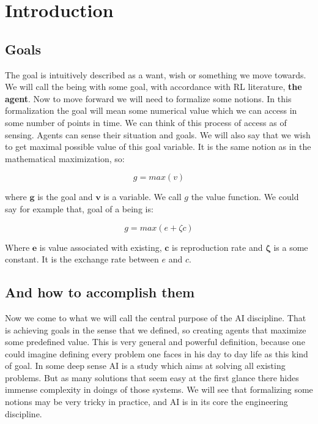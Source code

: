 \setcounter{page}{1}
%

\chapter{Introduction}
\label{chap:intro}



\section{Goals}

The goal is intuitively described as a want, wish or something we move towards. We will call the being with some goal, with accordance with RL literature, \textbf{the agent}. Now to move forward we will need to formalize some notions. In this formalization the goal will mean some numerical value which we can access in some number of points in time. We can think of this process of access as of sensing. Agents can sense their situation and goals. We will also say that we wish to get maximal possible value of this goal variable. It is the same notion as in the mathematical maximization, so:

\begin{equation}
	g = max(v)
\end{equation}

where $\boldsymbol{g}$ is the goal and $\boldsymbol{v}$ is a variable. We call $g$ the value function. We could say for example that, goal of a being is:

\begin{equation}
	g = max(e + \zeta c)
\end{equation}


Where $\boldsymbol{e}$ is value associated with existing, $\boldsymbol{c}$ is reproduction rate and $\boldsymbol{\zeta}$ is a some constant. It is the exchange rate between $e$ and $c$.

\section{And how to accomplish them}

Now we come to what we will call the central purpose of the AI discipline. That is achieving goals in the sense that we defined, so creating agents that maximize some predefined value. This is very general and powerful definition, because one could imagine defining every problem one faces in his day to day life as this kind of goal. In some deep sense AI is a study which aims at solving all existing problems. But as many solutions that seem easy at the first glance there hides immense complexity in doings of those systems. We will see that formalizing some notions may be very tricky in practice, and AI is in its core the engineering discipline.


